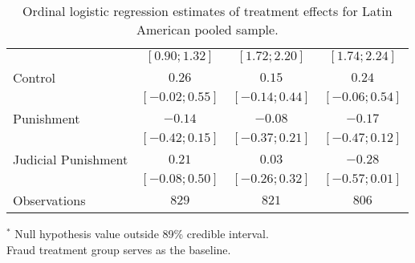 \begin{table}[h]
\begin{center}
\begin{threeparttable}
\begin{tabular}{l c c c}
                    & $ [ 0.90;  1.32]$ & $ [ 1.72;  2.20]$ & $ [ 1.74;  2.24]$ \\
Control             & $0.26$            & $0.15$            & $0.24$            \\
                    & $ [-0.02;  0.55]$ & $ [-0.14;  0.44]$ & $ [-0.06;  0.54]$ \\
Punishment          & $-0.14$           & $-0.08$           & $-0.17$           \\
                    & $ [-0.42;  0.15]$ & $ [-0.37;  0.21]$ & $ [-0.47;  0.12]$ \\
Judicial Punishment & $0.21$            & $0.03$            & $-0.28$           \\
                    & $ [-0.08;  0.50]$ & $ [-0.26;  0.32]$ & $ [-0.57;  0.01]$ \\
\hline
Observations        & $829$             & $821$             & $806$             \\
\hline
\end{tabular}
\begin{tablenotes}[flushleft]
\scriptsize{$^*$ Null hypothesis value outside 89\% credible interval.  \\
Fraud treatment group serves as the baseline.}
\end{tablenotes}
\end{threeparttable}
\caption{Ordinal logistic regression estimates of treatment effects for Latin American pooled sample.}
\label{table:coefficients}
\end{center}
\end{table}

